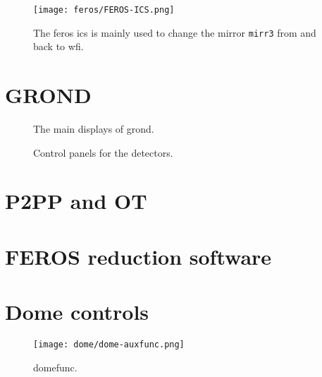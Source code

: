 \documentclass[11pt,fleqn]{book} %
\begin{document}
\begin{figure}[!ht]
\centering
\texttt{[image: feros/FEROS-ICS.png]}
\caption[FEROS instrument control software panel]{The \gls{feros} \gls{ics} is mainly used to change the mirror 
\texttt{mirr3} from and back to \gls{wfi}.}
\label{fig:ferosics}
\end{figure}


\section{GROND}

\begin{figure}[!ht]
\centering
{}\hfill
{}
\caption{The main displays of \gls{grond}.}
\label{fig:grondmain}
\end{figure}

\begin{figure}[!ht]
\centering
{}\hfill
{}
\caption{Control panels for the detectors.}
\label{fig:gronddet}
\end{figure}



\section{P2PP and OT}

\section{FEROS reduction software}

\section{Dome controls}
\begin{figure}[!ht]
\centering
\texttt{[image: dome/dome-auxfunc.png]}
\caption{\gls{domefunc}.}
\label{fig:domefunc}
\end{figure}
\end{document}
